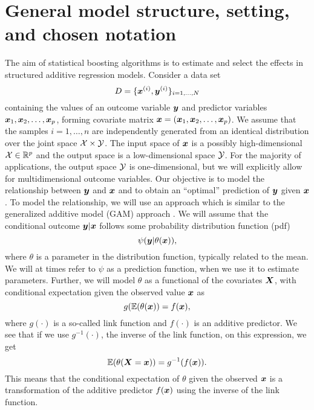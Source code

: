 \section{General model structure, setting, and chosen notation} %
The aim of statistical boosting algorithms is to estimate and select the effects in structured additive regression models.
Consider a data set
\begin{equation}
    D=\{\bm{x}^{(i)},\bm{y}^{(i)}\}_{i=1,\ldots,N}
\end{equation}
containing the values of an outcome variable $\bm{y}$ and predictor variables $\bm{x}_1, \bm{x}_2,\ldots,\bm{x}_p$, forming covariate matrix $\bm{x}=(\bm{x}_1, \bm{x}_2,\ldots,\bm{x}_p)$.
We assume that the samples $i=1,\ldots,n$ are independently generated from an identical distribution over the joint space $\mathcal{X}\times\mathcal{Y}$.
The input space of $\bm{x}$ is a possibly high-dimensional $\mathcal{X}\in\mathbb{R}^p$ and the output space is a low-dimensional space $\mathcal{Y}$.
For the majority of applications, the output space $\mathcal{Y}$ is one-dimensional, but we will explicitly allow for multidimensional outcome variables.
Our objective is to model the relationship between $\bm{y}$ and $\bm{x}$ and to obtain an ``optimal'' prediction of $\bm{y}$ given $\bm{x}$.
To model the relationship, we will use an approach which is similar to the generalized additive model (GAM) approach \citep{gam-book}.
We will assume that the conditional outcome $\bm{y}|\bm{x}$ follows some probability distribution function (pdf)
\begin{equation}\label{eq:psi}
    \psi(\bm{y}|\theta(\bm{x})),
\end{equation}
where $\theta$ is a parameter in the distribution function, typically related to the mean. We will at times refer to $\psi$ as a prediction function, when we use it to estimate parameters.
Further, we will model $\theta$ as a functional of the covariates $\bm{X}$, with conditional expectation given the observed value $\bm{x}$ as
\begin{equation}
    g(\mathbb{E}(\theta(\bm{x}))=f(\bm{x}),
\end{equation}
where $g(\cdot)$ is a so-called link function and $f(\cdot)$ is an additive predictor.
We see that if we use $g^{-1}(\cdot)$, the inverse of the link function, on this expression, we get
\begin{equation}
    \mathbb{E}(\theta(\bm{X}=\bm{x}))=g^{-1}(f(\bm{x})).
\end{equation}
This means that the conditional expectation of $\theta$ given the observed $\bm{x}$ is a transformation of the additive predictor $f(\bm{x})$ using the inverse of the link function.
